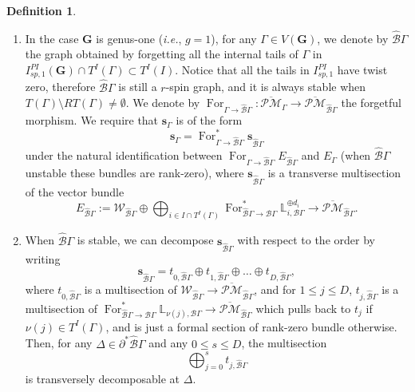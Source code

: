 \documentclass[11pt]{amsart}
\theoremstyle{definition}
\newtheorem{dfn}[dummy]{Definition}
\theoremstyle{remark}
\newcommand{\oPMb}{{\overline{\mathcal{PM}}}}
\newcommand{\<}{\left<}
\renewcommand{\>}{\right>}
\numberwithin{equation}{section}
\begin{document}
\begin{dfn}
\begin{enumerate}
        
        \item \label{item canonical forget g=1} In the case $\bm{G}$ is genus-one (\textit{i.e.}, $g=1$), for any $\Gamma\in V(\bm G)$, we denote by $\hat{\mathcal B }\Gamma$ the graph obtained by forgetting all the internal tails of $\Gamma$ in $I^{PI}_{sp,1}(\mathbf{G})\cap T^I(\Gamma)\subset T^I(I)$. 
        Notice that all the tails in $I^{PI}_{sp,1}$ have twist zero, therefore  $\hat{\mathcal B }\Gamma$ is still a $r$-spin graph, and it is always stable when $T(\Gamma)\setminus RT(\Gamma) \ne \emptyset$.
        We denote by $\operatorname{For}_{\Gamma \to \hat{\mathcal B }\Gamma}\colon \oPMb_{\Gamma} \to \oPMb_{\hat{\mathcal B }\Gamma}$ the forgetful morphism. We require that $\bm{s}_{\Gamma}^{}$ is of the form 
        \begin{equation}\label{eq canonical only see roots}
        \bm{s}_{\Gamma}^{}=\operatorname{For}^*_{\Gamma \to \hat{\mathcal B }\Gamma} \bm{s}_{\hat{\mathcal B }\Gamma}^{}
        \end{equation}
        under the natural identification between $\operatorname{For}_{\Gamma \to \hat{\mathcal B }\Gamma} E_{\hat{\mathcal B }\Gamma}$ and $E_\Gamma$ (when $\hat{\mathcal B }\Gamma$ unstable these bundles are rank-zero), where $\bm{s}_{\hat{\mathcal B }\Gamma}^{}$ is a transverse multisection of the vector bundle
        $$E_{\hat{\mathcal B }\Gamma}:=\mathcal W_{\hat{\mathcal B}\Gamma}\oplus \bigoplus_{i\in I\cap T^I(\Gamma)} \operatorname{For}^*_{\hat{\mathcal B}\Gamma\to \mathcal B \Gamma}\mathbb L_{i,\mathcal B \Gamma}^{\oplus d_i}\to \oPMb_{\hat{\mathcal B }\Gamma}.$$

        \item \label{item canonical transversely decompose}
         When $\hat{\mathcal B}\Gamma$ is stable, we can decompose $\bm{s}_{\hat{\mathcal B }\Gamma}^{}$ with respect to the order by writing
         $$
         \bm{s}_{\hat{\mathcal B }\Gamma}^{}=t_{0,\hat{\mathcal B }\Gamma}\oplus t_{1,\hat{\mathcal B }\Gamma}\oplus\dots \oplus t_{D,\hat{\mathcal B }\Gamma},
         $$
            where $t_{0,\hat{\mathcal B }\Gamma}$ is a multisection of $\mathcal W_{\hat{\mathcal B }\Gamma}\to \oPMb_{\hat{\mathcal B }\Gamma}$, and for $1\le j \le D$, $t_{j,\hat{\mathcal B }\Gamma}$ is a multisection of $\operatorname{For}^*_{\hat{\mathcal B }\Gamma\to {\mathcal B }\Gamma}\mathbb L_{\nu(j),{\mathcal B }\Gamma}\to \oPMb_{\hat{\mathcal B }\Gamma}$ which pulls back to $t_j$ if $\nu(j)\in T^I(\Gamma)$, and is just a formal section of rank-zero bundle otherwise.
             Then, for any $\Delta\in \partial^* \hat{\mathcal B}\Gamma$ and any $0\le s \le D$, the multisection $$\bigoplus_{j=0}^s t_{j,\hat{\mathcal B }\Gamma}$$ is  transversely decomposable at $\Delta$. 
         

\end{enumerate}
\end{dfn}
\end{document}
